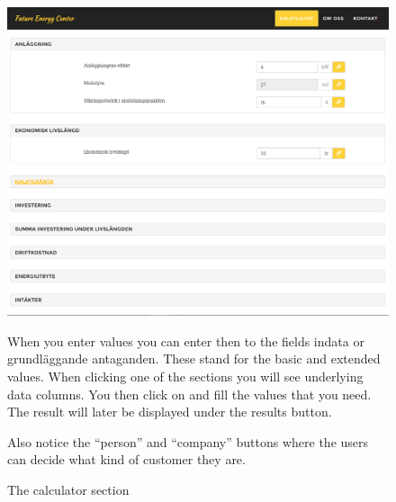 \documentclass[]{article}
\begin{document}
\begin{figure}[H]
	\includegraphics[width=1.0\linewidth]{Bild7}
	\caption{The calculator section}
	\medskip
	\small
	When you enter values you can enter then to the fields indata or grundläggande antaganden. These stand for the basic and extended values. When clicking one of the sections you will see underlying data columns. You then click on and fill the values that you need. The result will later be displayed under the results button.
	
	Also notice the “person” and “company” buttons where the users can decide what kind of customer they are. 
	\label{fig:Bild7}
\end{figure}
\end{document}
